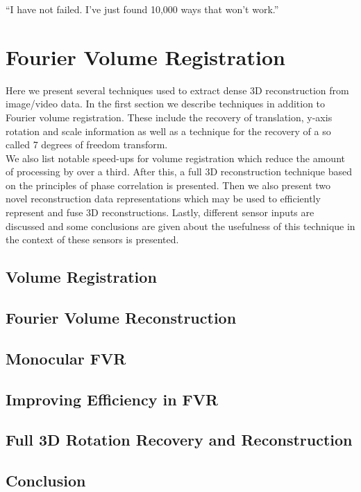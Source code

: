 \begin{savequote}[8cm]
  ``I have not failed. I've just found 10,000 ways that won't work.''
\end{savequote}
\makeatletter
\chapter{Fourier Volume Registration}
\label{FVRSectionA}

Here we present several techniques used to extract dense 3D reconstruction from image/video data. In the first section we describe techniques in addition to Fourier volume registration. These include the recovery of translation, y-axis rotation and scale information as well as a technique for the recovery of a so called 7 degrees of freedom transform. \\

We also list notable speed-ups for volume registration which reduce the amount of processing by over a third. After this, a full 3D reconstruction technique based on the principles of phase correlation is presented. Then we also present two novel reconstruction data representations which may be used to efficiently represent and fuse 3D reconstructions. Lastly, different sensor inputs are discussed and some conclusions are given about the usefulness of this technique in the context of these sensors is presented.


\section{Volume Registration}

\section{Fourier Volume Reconstruction}

\section{Monocular FVR}

\section{Improving Efficiency in FVR}

\section{Full 3D Rotation Recovery and Reconstruction}



\section{Conclusion}